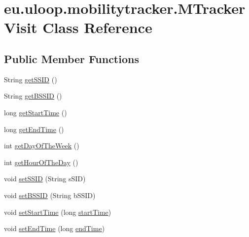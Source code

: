 \hypertarget{classeu_1_1uloop_1_1mobilitytracker_1_1MTrackerVisit}{\section{eu.\+uloop.\+mobilitytracker.\+M\+Tracker\+Visit Class Reference}
\label{classeu_1_1uloop_1_1mobilitytracker_1_1MTrackerVisit}
}
\subsection*{Public Member Functions}
\begin{DoxyCompactItemize}
\item 
String \hyperlink{classeu_1_1uloop_1_1mobilitytracker_1_1MTrackerVisit_a8accc27af02ead95cb569845ea6b5db1}{get\+S\+S\+I\+D} ()
\item 
String \hyperlink{classeu_1_1uloop_1_1mobilitytracker_1_1MTrackerVisit_a62a52eacd13be716a7825d8f3015a286}{get\+B\+S\+S\+I\+D} ()
\item 
long \hyperlink{classeu_1_1uloop_1_1mobilitytracker_1_1MTrackerVisit_af9354b202fae1c0f48829c82dc0e12ce}{get\+Start\+Time} ()
\item 
long \hyperlink{classeu_1_1uloop_1_1mobilitytracker_1_1MTrackerVisit_a3f42cdcc77b7d12fc0365978385bdcb9}{get\+End\+Time} ()
\item 
int \hyperlink{classeu_1_1uloop_1_1mobilitytracker_1_1MTrackerVisit_ae6b9fbee6589d7f9bbe1a7343bed1318}{get\+Day\+Of\+The\+Week} ()
\item 
int \hyperlink{classeu_1_1uloop_1_1mobilitytracker_1_1MTrackerVisit_af3c824a42b2d611b36dbc5ec651da2d7}{get\+Hour\+Of\+The\+Day} ()
\item 
void \hyperlink{classeu_1_1uloop_1_1mobilitytracker_1_1MTrackerVisit_a4655225f5aea8b86de58af107509fc5b}{set\+S\+S\+I\+D} (String s\+S\+I\+D)
\item 
void \hyperlink{classeu_1_1uloop_1_1mobilitytracker_1_1MTrackerVisit_adbb715806badaa1e7ee2fab50611c260}{set\+B\+S\+S\+I\+D} (String b\+S\+S\+I\+D)
\item 
void \hyperlink{classeu_1_1uloop_1_1mobilitytracker_1_1MTrackerVisit_a55ee44dc0be0cda19dbd0a0b80aa6dc1}{set\+Start\+Time} (long \hyperlink{classeu_1_1uloop_1_1mobilitytracker_1_1MTrackerVisit_ae176a1cf5c83af3b438c6d5f1afc6e52}{start\+Time})
\item 
void \hyperlink{classeu_1_1uloop_1_1mobilitytracker_1_1MTrackerVisit_a51cbcf50a13328aeb4c4298a25ed11b0}{set\+End\+Time} (long \hyperlink{classeu_1_1uloop_1_1mobilitytracker_1_1MTrackerVisit_a784e03ea2ea0ef6d31b6bf9ee2b4ed86}{end\+Time})

\end{DoxyCompactItemize}
